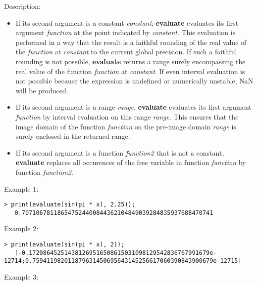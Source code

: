 \noindent Description: \begin{itemize}

\item If its second argument is a constant \emph{constant}, \textbf{evaluate} evaluates
   its first argument \emph{function} at the point indicated by
   \emph{constant}. This evaluation is performed in a way that the result is a
   faithful rounding of the real value of the \emph{function} at \emph{constant} to
   the current global precision. If such a faithful rounding is not
   possible, \textbf{evaluate} returns a range surely encompassing the real value
   of the function \emph{function} at \emph{constant}. If even interval evaluation
   is not possible because the expression is undefined or numerically
   unstable, NaN will be produced.

\item If its second argument is a range \emph{range}, \textbf{evaluate} evaluates its
   first argument \emph{function} by interval evaluation on this range
   \emph{range}. This ensures that the image domain of the function \emph{function}
   on the pre-image domain \emph{range} is surely enclosed in the returned
   range.

\item If its second argument is a function \emph{function2} that is not a
   constant, \textbf{evaluate} replaces all occurences of the free variable in
   function \emph{function} by function \emph{function2}.
\end{itemize}
\noindent Example 1: 
\begin{center}\begin{minipage}{14.8cm}\begin{Verbatim}[frame=single]
   > print(evaluate(sin(pi * x), 2.25));
   0.707106781186547524400844362104849039284835937688470741
\end{Verbatim}
\end{minipage}\end{center}
\noindent Example 2: 
\begin{center}\begin{minipage}{14.8cm}\begin{Verbatim}[frame=single]
   > print(evaluate(sin(pi * x), 2));
   [-0.172986452514381269516508615031098129542836767991679e-12714;0.759411982011879631450695643145256617060390843900679e-12715]
\end{Verbatim}
\end{minipage}\end{center}
\noindent Example 3: 
